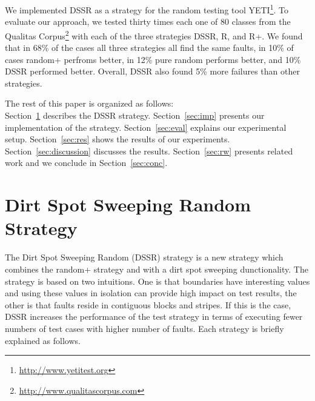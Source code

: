 \documentclass[conference]{IEEEtran}
\begin{document}
We implemented DSSR as a strategy for the random testing tool YETI\footnote{\url{http://www.yetitest.org}}. To evaluate our approach, we tested thirty times each one of 80 classes from the Qualitas Corpus\footnote{\url{http://www.qualitascorpus.com}} with each of the three strategies DSSR, R, and R+. We found that in 68\% of the cases all three strategies all find the same faults, in 10\% of cases random+ perfroms better, in 12\% pure random performs better, and 10\% DSSR performed better.
Overall, DSSR also found 5\% more failures than other strategies.

%
%
%
%
%
%
The rest of this paper is organized as follows: \\
Section~\ref{sec:dssr} describes the DSSR strategy. Section~\ref{sec:imp} presents our implementation of the strategy. Section~\ref{sec:eval} explains our experimental setup. Section~\ref{sec:res} shows the results of our experiments. Section~\ref{sec:discussion} discusses the results. Section~\ref{sec:rw} presents related work and we conclude in Section~\ref{sec:conc}.





\section{Dirt Spot Sweeping Random Strategy}\label{sec:dssr}
The Dirt Spot Sweeping Random (DSSR) strategy is a new strategy which combines the random+ strategy and with a dirt spot sweeping dunctionality. The strategy is based on two intuitions. One is that boundaries have interesting values and using these values in isolation can provide high impact on test results, the other is that faults reside in contiguous blocks and stripes. If this is the case, DSSR increases the performance of the test strategy in terms of executing fewer numbers of test cases with higher number of faults. Each strategy is briefly explained as follows.
\end{document}
